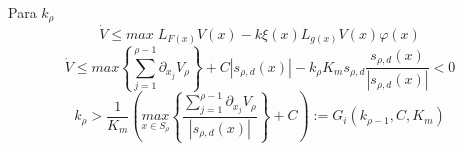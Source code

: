Para $k_\rho$
        \begin{equation}
            \dot{V}\leq max\;L_{F(x)}V(x)-k\xi(x)L_{g(x)}V(x)\varphi(x)
        \end{equation}
        \begin{equation}
            \dot{V}\leq max \left\lbrace \sum_{j=1}^{\rho-1}\partial_{x_j}V_{\rho}\right\rbrace +C|s_{\rho,d}(x)|-k_{\rho} K_m s_{\rho,d}\frac{s_{\rho,d}(x)}{|s_{\rho,d}(x)|}<0
        \end{equation}
        \begin{equation}
            k_{\rho}> \frac{1}{K_m} \left(\underset{x \in S_{\rho}}{max}\left\lbrace \frac{\sum_{j=1}^{\rho-1}\partial_{x_j}V_{\rho}}{|s_{\rho,d}(x)|} \right\rbrace+C\right):=G_i(k_{\rho-1},C,K_m)
        \end{equation}
    


